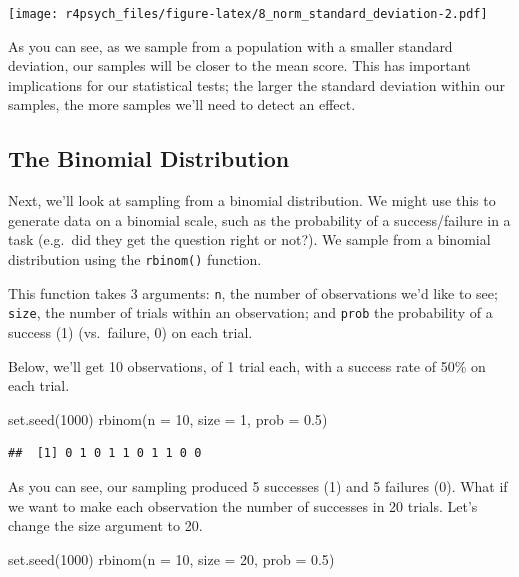 \documentclass[
]{book}
\newenvironment{Shaded}{\begin{snugshade}}{\end{snugshade}}
\newcommand{\AttributeTok}[1]{\textcolor[rgb]{0.77,0.63,0.00}{#1}}
\newcommand{\DecValTok}[1]{\textcolor[rgb]{0.00,0.00,0.81}{#1}}
\newcommand{\FloatTok}[1]{\textcolor[rgb]{0.00,0.00,0.81}{#1}}
\newcommand{\FunctionTok}[1]{\textcolor[rgb]{0.00,0.00,0.00}{#1}}
\newcommand{\NormalTok}[1]{#1}
\begin{document}
\texttt{[image: r4psych\_files/figure-latex/8\_norm\_standard\_deviation-2.pdf]}

As you can see, as we sample from a population with a smaller standard deviation, our samples will be closer to the mean score. This has important implications for our statistical tests; the larger the standard deviation within our samples, the more samples we'll need to detect an effect.

\hypertarget{the-binomial-distribution}{%
\subsection{The Binomial Distribution}\label{the-binomial-distribution}}

Next, we'll look at sampling from a binomial distribution. We might use this to generate data on a binomial scale, such as the probability of a success/failure in a task (e.g.~did they get the question right or not?). We sample from a binomial distribution using the \texttt{rbinom()} function.

This function takes 3 arguments: \texttt{n}, the number of observations we'd like to see; \texttt{size}, the number of trials within an observation; and \texttt{prob} the probability of a success (1) (vs.~failure, 0) on each trial.

Below, we'll get 10 observations, of 1 trial each, with a success rate of 50\% on each trial.

\begin{Shaded}
\begin{Highlighting}[]
\FunctionTok{set.seed}\NormalTok{(}\DecValTok{1000}\NormalTok{)}
\FunctionTok{rbinom}\NormalTok{(}\AttributeTok{n =} \DecValTok{10}\NormalTok{, }\AttributeTok{size =} \DecValTok{1}\NormalTok{, }\AttributeTok{prob =} \FloatTok{0.5}\NormalTok{)}
\end{Highlighting}
\end{Shaded}

\begin{verbatim}
##  [1] 0 1 0 1 1 0 1 1 0 0
\end{verbatim}

As you can see, our sampling produced 5 successes (1) and 5 failures (0). What if we want to make each observation the number of successes in 20 trials. Let's change the size argument to 20.

\begin{Shaded}
\begin{Highlighting}[]
\FunctionTok{set.seed}\NormalTok{(}\DecValTok{1000}\NormalTok{)}
\FunctionTok{rbinom}\NormalTok{(}\AttributeTok{n =} \DecValTok{10}\NormalTok{, }\AttributeTok{size =} \DecValTok{20}\NormalTok{, }\AttributeTok{prob =} \FloatTok{0.5}\NormalTok{)}
\end{Highlighting}
\end{Shaded}
\end{document}
